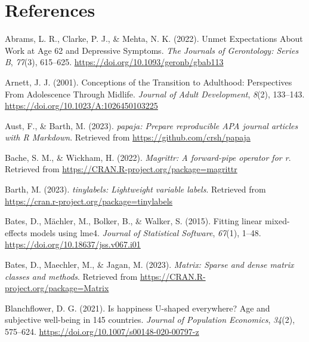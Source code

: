 \documentclass[
  man,floatsintext]{apa6}
\newlength{\cslhangindent}
\newlength{\cslentryspacingunit} %
\newenvironment{CSLReferences}[2] %
 {%
  \setlength{\parindent}{0pt}
  \ifodd #1
  \let\oldpar\par
  \def\par{\hangindent=\cslhangindent\oldpar}
  \fi
  \setlength{\parskip}{#2\cslentryspacingunit}
 }%
 {}
\begin{document}
\newpage

\hypertarget{references}{%
\section{References}\label{references}}

\hypertarget{refs}{}
\begin{CSLReferences}{1}{0}
\leavevmode{}%
Abrams, L. R., Clarke, P. J., \& Mehta, N. K. (2022). Unmet {Expectations About Work} at {Age} 62 and {Depressive Symptoms}. \emph{The Journals of Gerontology: Series B}, \emph{77}(3), 615--625. \url{https://doi.org/10.1093/geronb/gbab113}

\leavevmode{}%
Arnett, J. J. (2001). Conceptions of the {Transition} to {Adulthood}: {Perspectives From Adolescence Through Midlife}. \emph{Journal of Adult Development}, \emph{8}(2), 133--143. \url{https://doi.org/10.1023/A:1026450103225}

\leavevmode{}%
Aust, F., \& Barth, M. (2023). \emph{{papaja}: {Prepare} reproducible {APA} journal articles with {R Markdown}}. Retrieved from \url{https://github.com/crsh/papaja}

\leavevmode{}%
Bache, S. M., \& Wickham, H. (2022). \emph{Magrittr: A forward-pipe operator for r}. Retrieved from \url{https://CRAN.R-project.org/package=magrittr}

\leavevmode{}%
Barth, M. (2023). \emph{{tinylabels}: Lightweight variable labels}. Retrieved from \url{https://cran.r-project.org/package=tinylabels}

\leavevmode{}%
Bates, D., Mächler, M., Bolker, B., \& Walker, S. (2015). Fitting linear mixed-effects models using {lme4}. \emph{Journal of Statistical Software}, \emph{67}(1), 1--48. \url{https://doi.org/10.18637/jss.v067.i01}

\leavevmode{}%
Bates, D., Maechler, M., \& Jagan, M. (2023). \emph{Matrix: Sparse and dense matrix classes and methods}. Retrieved from \url{https://CRAN.R-project.org/package=Matrix}

\leavevmode{}%
Blanchflower, D. G. (2021). Is happiness {U-shaped} everywhere? {Age} and subjective well-being in 145 countries. \emph{Journal of Population Economics}, \emph{34}(2), 575--624. \url{https://doi.org/10.1007/s00148-020-00797-z}


\end{CSLReferences}
\end{document}

